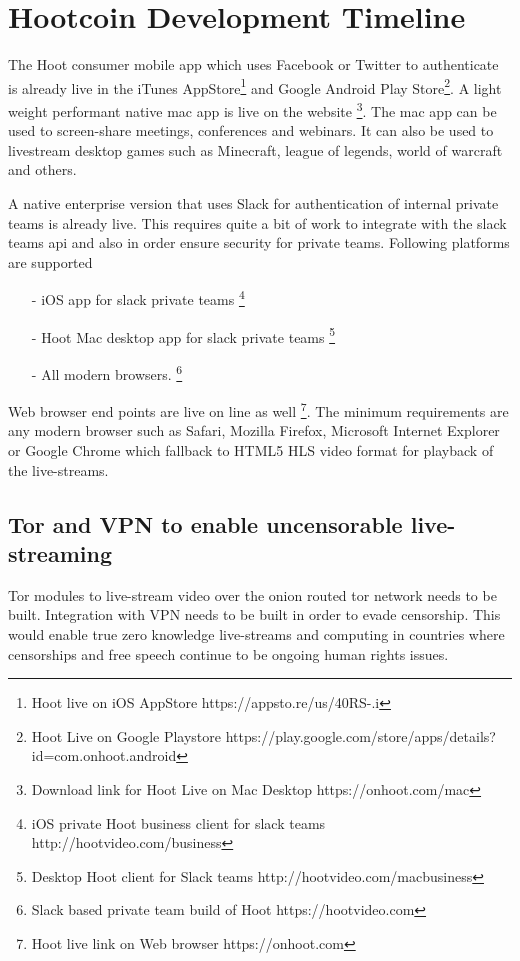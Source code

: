 \documentclass{article}
\begin{document}

\section{Hootcoin Development Timeline}
The Hoot consumer mobile app which uses Facebook or Twitter to authenticate is already live in the iTunes AppStore\footnote{Hoot live on iOS AppStore https://appsto.re/us/40RS-.i} and Google Android Play Store\footnote{Hoot Live on Google Playstore https://play.google.com/store/apps/details?id=com.onhoot.android}.
A light weight performant native  mac app is live on
the website \footnote{Download link for Hoot Live on Mac Desktop https://onhoot.com/mac}. The mac app can be used to screen-share meetings, conferences and webinars. It can also be used
to livestream desktop games such as Minecraft, league of legends,
world of warcraft and others.

A native enterprise version that uses Slack for authentication of
internal private teams is already live.
 This requires quite a bit of work to integrate with the slack teams api and also in order  ensure security for private teams. Following platforms are supported
\begin{itemize}

\item[-]iOS app for slack private teams \footnote{ iOS private Hoot business client for slack teams http://hootvideo.com/business}
\item[-]Hoot Mac desktop app for slack private teams \footnote{Desktop Hoot client for Slack teams http://hootvideo.com/macbusiness}
\item[-]All modern browsers. \footnote{Slack based private team build of Hoot https://hootvideo.com}
\end{itemize}

Web browser end points are live on line as well
\footnote{Hoot live link on Web browser https://onhoot.com}. The minimum requirements are any modern
browser such as Safari, Mozilla Firefox, Microsoft Internet Explorer
or Google Chrome which fallback to HTML5 HLS video format for playback
of the live-streams.


\subsection{Tor and VPN to enable uncensorable live-streaming }
Tor modules to live-stream video over the onion routed tor network needs
to be built. Integration with VPN needs to be built in order to evade censorship. This would enable true zero knowledge live-streams and computing in
countries where censorships and free speech continue to be ongoing
human rights issues.
\end{document}
